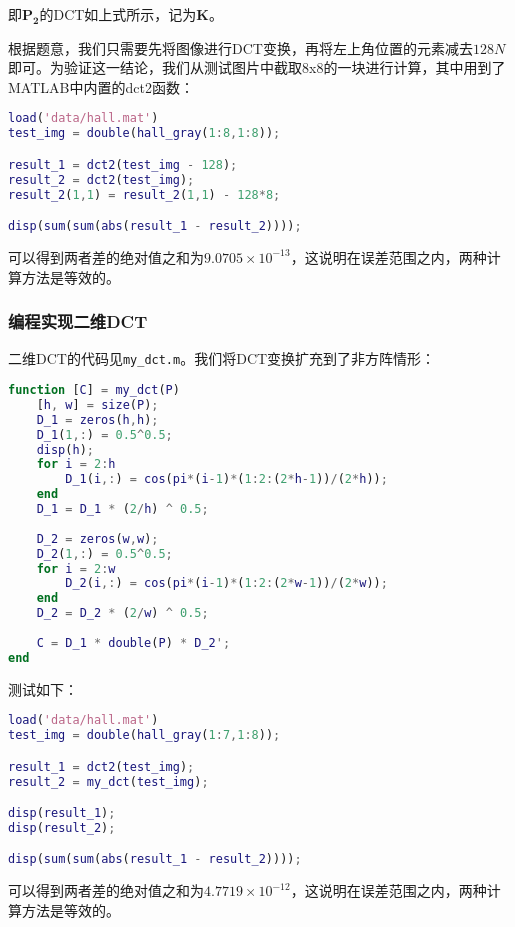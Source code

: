 \documentclass[a4paper]{article}
\begin{document}
\par 即$\mathbf{P_2}$的DCT如上式所示，记为$\mathbf{K}$。
\par 根据题意，我们只需要先将图像进行DCT变换，再将左上角位置的元素减去$128N$即可。为验证这一结论，我们从测试图片中截取8x8的一块进行计算，其中用到了MATLAB中内置的dct2函数：
\begin{lstlisting}[language=matlab, caption=两种DCT变换形式比较]
load('data/hall.mat')
test_img = double(hall_gray(1:8,1:8));

result_1 = dct2(test_img - 128);
result_2 = dct2(test_img);
result_2(1,1) = result_2(1,1) - 128*8;

disp(sum(sum(abs(result_1 - result_2))));
\end{lstlisting}
\par 可以得到两者差的绝对值之和为$9.0705\times10^{-13}$，这说明在误差范围之内，两种计算方法是等效的。

\subsubsection{编程实现二维DCT}
\par 二维DCT的代码见\lstinline{my_dct.m}。我们将DCT变换扩充到了非方阵情形：
\begin{lstlisting}[language=matlab, caption=自定义DCT]
function [C] = my_dct(P)
    [h, w] = size(P);
    D_1 = zeros(h,h);
    D_1(1,:) = 0.5^0.5;
    disp(h);
    for i = 2:h
        D_1(i,:) = cos(pi*(i-1)*(1:2:(2*h-1))/(2*h));
    end
    D_1 = D_1 * (2/h) ^ 0.5;
    
    D_2 = zeros(w,w);
    D_2(1,:) = 0.5^0.5;
    for i = 2:w
        D_2(i,:) = cos(pi*(i-1)*(1:2:(2*w-1))/(2*w));
    end
    D_2 = D_2 * (2/w) ^ 0.5;
    
    C = D_1 * double(P) * D_2';
end
\end{lstlisting}
\par 测试如下：
\begin{lstlisting}[language=matlab, caption=两种DCT变换形式比较]
load('data/hall.mat')
test_img = double(hall_gray(1:7,1:8));

result_1 = dct2(test_img);
result_2 = my_dct(test_img);

disp(result_1);
disp(result_2);

disp(sum(sum(abs(result_1 - result_2))));
\end{lstlisting}
\par 可以得到两者差的绝对值之和为$4.7719\times10^{-12}$，这说明在误差范围之内，两种计算方法是等效的。
\end{document}
